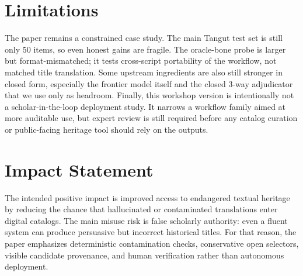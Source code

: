 \documentclass{article}
\begin{document}
\section{Limitations}

The paper remains a constrained case study. The main Tangut test set is still only 50 items, so even honest gains are fragile. The oracle-bone probe is larger but format-mismatched; it tests cross-script portability of the workflow, not matched title translation. Some upstream ingredients are also still stronger in closed form, especially the frontier model itself and the closed 3-way adjudicator that we use only as headroom. Finally, this workshop version is intentionally not a scholar-in-the-loop deployment study. It narrows a workflow family aimed at more auditable use, but expert review is still required before any catalog curation or public-facing heritage tool should rely on the outputs.

\section*{Impact Statement}

The intended positive impact is improved access to endangered textual heritage by reducing the chance that hallucinated or contaminated translations enter digital catalogs. The main misuse risk is false scholarly authority: even a fluent system can produce persuasive but incorrect historical titles. For that reason, the paper emphasizes deterministic contamination checks, conservative open selectors, visible candidate provenance, and human verification rather than autonomous deployment.
\end{document}
